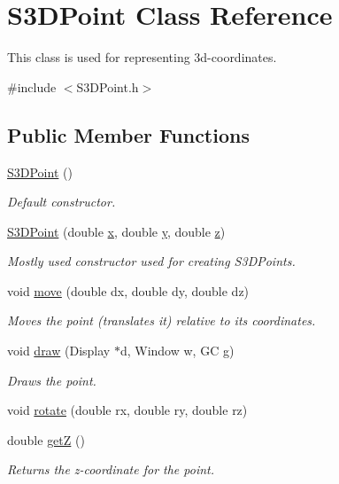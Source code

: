 \hypertarget{class_s3_d_point}{
\section{S3DPoint Class Reference}
\label{class_s3_d_point}
}


This class is used for representing 3d-\/coordinates.  




{\ttfamily \#include $<$S3DPoint.h$>$}

\subsection*{Public Member Functions}
\begin{DoxyCompactItemize}
\item 
\hyperlink{class_s3_d_point_adad5537c6692acccab628a6bc105d20e}{S3DPoint} ()
\begin{DoxyCompactList}\small\item\em Default constructor. \item\end{DoxyCompactList}\item 
\hyperlink{class_s3_d_point_ab03f0683b11340e8071eb8cdde1811b3}{S3DPoint} (double \hyperlink{class_s3_d_point_ae6b39611c603bd43ea67bcf4438a932a}{x}, double \hyperlink{class_s3_d_point_a487ab6dfdcb00ddbf9485f0b71ad7fb5}{y}, double \hyperlink{class_s3_d_point_ace7df3a87344170ddb4bfc92c3d5ec3d}{z})
\begin{DoxyCompactList}\small\item\em Mostly used constructor used for creating S3DPoints. \item\end{DoxyCompactList}\item 
void \hyperlink{class_s3_d_point_a18bbc742cbadc8d49d0600c3f80caf91}{move} (double dx, double dy, double dz)
\begin{DoxyCompactList}\small\item\em Moves the point (translates it) relative to its coordinates. \item\end{DoxyCompactList}\item 
void \hyperlink{class_s3_d_point_a59aee595c8ae9bfbb60915a09c06b0aa}{draw} (Display $\ast$d, Window w, GC g)
\begin{DoxyCompactList}\small\item\em Draws the point. \item\end{DoxyCompactList}\item 
void \hyperlink{class_s3_d_point_a4d51ed60f8d2e7ee2edd060cfdef22d4}{rotate} (double rx, double ry, double rz)
\item 
double \hyperlink{class_s3_d_point_a255a77e4ca340344be1b1bd6b6a3f418}{getZ} ()
\begin{DoxyCompactList}\small\item\em Returns the z-\/coordinate for the point. \item\end{DoxyCompactList}\end{DoxyCompactItemize}
